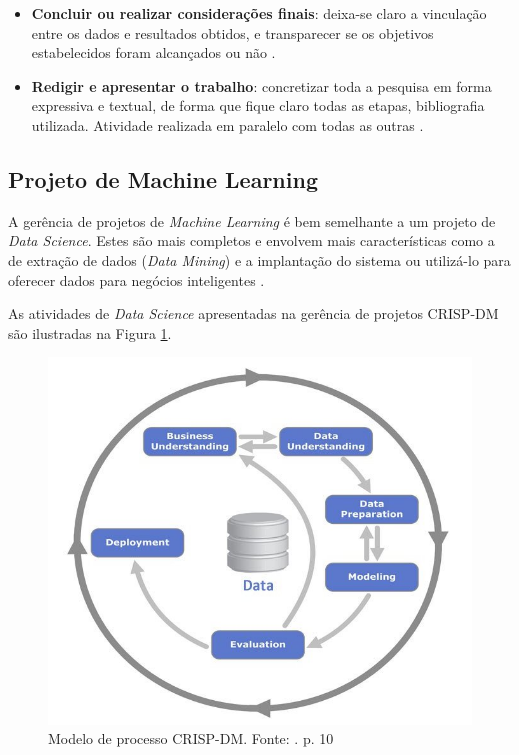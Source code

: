\begin{itemize}
  \item \textbf{Concluir ou realizar considerações finais}: deixa-se claro a vinculação entre os dados e resultados obtidos, e transparecer se os objetivos estabelecidos foram alcançados ou não \cite{GIL2002}.
  \item \textbf{Redigir e apresentar o trabalho}: concretizar toda a pesquisa em forma expressiva e textual, de forma que fique claro todas as etapas, bibliografia utilizada. Atividade realizada em paralelo com todas as outras \cite{PRODANOV2013}.
\end{itemize}

\subsection{Projeto de Machine Learning} \label{sec:projetoML}

A gerência de projetos de \textit{Machine Learning} é bem semelhante a um projeto de \textit{Data Science}. Estes são mais completos e envolvem mais características como a de extração de dados (\textit{Data Mining}) e a implantação do sistema ou utilizá-lo para oferecer dados para negócios inteligentes \cite{CHAPMAN2000}.

As atividades de \textit{Data Science} apresentadas na gerência de projetos CRISP-DM são ilustradas na Figura \ref{fig:crispdmProcess}.

\begin{figure}[h]
	\centering
    \includegraphics[keepaspectratio=true,scale=0.3]{figuras/crispdmProcess}
	\caption[Modelo de processo CRISP-DM]{Modelo de processo CRISP-DM. Fonte: \citeauthor{CHAPMAN2000} \citeyear{CHAPMAN2000}. p. 10}
	\label{fig:crispdmProcess}
\end{figure}

